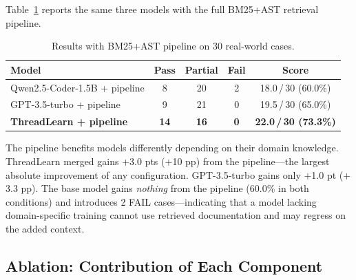 \documentclass[runningheads]{llncs}
\begin{document}
Table~\ref{tab:pipeline} reports the same three models with the full
BM25+AST retrieval pipeline.

\begin{table}[H]
  \centering
  \vspace{-0.3cm}
  \caption{Results with BM25+AST pipeline on 30 real-world cases.}
  \label{tab:pipeline}
  \begin{tabular}{@{}lcccc@{}}
    \toprule
    \textbf{Model} & \textbf{Pass} & \textbf{Partial} & \textbf{Fail} & \textbf{Score} \\
    \midrule
    Qwen2.5-Coder-1.5B + pipeline  & 8  & 20 & 2 & 18.0\,/\,30 (60.0\%) \\
    GPT-3.5-turbo + pipeline        & 9  & 21 & 0 & 19.5\,/\,30 (65.0\%) \\
    \textbf{ThreadLearn + pipeline} & \textbf{14} & \textbf{16} & \textbf{0} &
      \textbf{22.0\,/\,30 (73.3\%)} \\
    \bottomrule
  \end{tabular}
\end{table}

The pipeline benefits models differently depending on their domain
knowledge.
ThreadLearn merged gains $+$3.0 pts ($+$10 pp) from the pipeline---the
largest absolute improvement of any configuration.
GPT-3.5-turbo gains only $+$1.0 pt ($+$3.3 pp).
The base model gains \emph{nothing} from the pipeline
(60.0\% in both conditions) and introduces 2 FAIL cases---indicating
that a model lacking domain-specific training cannot use retrieved
documentation and may regress on the added context.

\subsection{Ablation: Contribution of Each Component}
\label{sec:eval:ablation}
\end{document}
